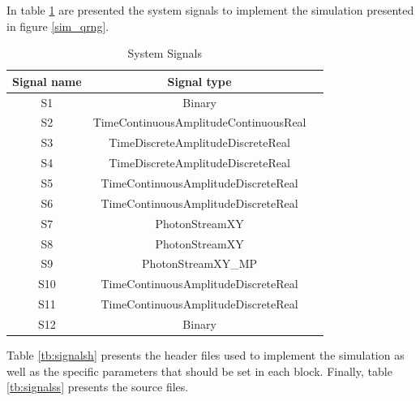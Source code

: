 In table \ref{tb:signals2} are presented the system signals to implement the simulation presented in figure \ref{sim_qrng}.
\begin{table}[H]
\centering
\caption{System Signals}
\label{tb:signals2}
\begin{tabular}{|c|c|c|}
\hline
\textbf{Signal name}                            & \textbf{Signal type}                      \\ \hline
S1                                              &  Binary                                   \\ \hline
S2                                              &  TimeContinuousAmplitudeContinuousReal    \\ \hline
S3                                              &  TimeDiscreteAmplitudeDiscreteReal        \\ \hline
S4                                              &  TimeDiscreteAmplitudeDiscreteReal        \\ \hline
S5                                              &  TimeContinuousAmplitudeDiscreteReal      \\ \hline
S6                                              &  TimeContinuousAmplitudeDiscreteReal      \\ \hline
S7                                              &  PhotonStreamXY                           \\ \hline
S8                                              &  PhotonStreamXY                           \\ \hline
S9                                              &  PhotonStreamXY\_MP                       \\ \hline
S10                                             &  TimeContinuousAmplitudeDiscreteReal      \\ \hline
S11                                             &  TimeContinuousAmplitudeDiscreteReal      \\ \hline
S12                                             &  Binary                                   \\ \hline
\end{tabular}
\end{table}

Table \ref{tb:signalsh} presents the header files used to implement the simulation as well as the specific parameters that should be set in each block. Finally, table \ref{tb:signalss} presents the source files.

